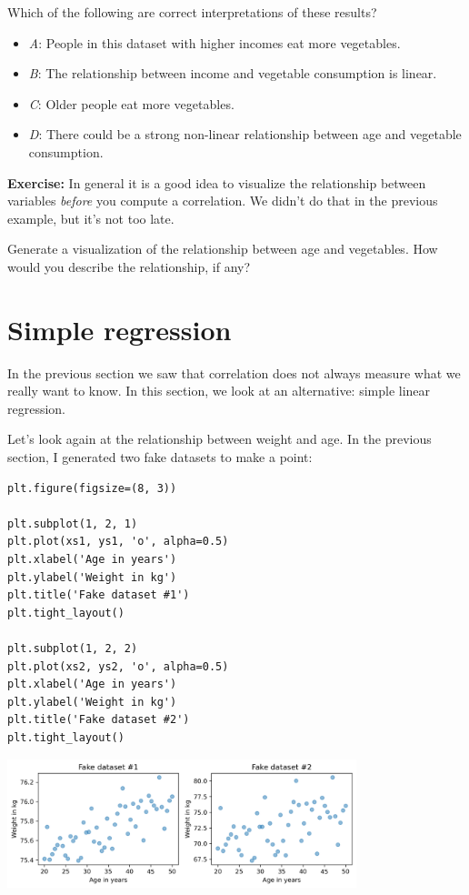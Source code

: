 Which of the following are correct interpretations of these results?

\begin{itemize}

\item
  \emph{A}: People in this dataset with higher incomes eat more
  vegetables.
\item
  \emph{B}: The relationship between income and vegetable consumption is
  linear.
\item
  \emph{C}: Older people eat more vegetables.
\item
  \emph{D}: There could be a strong non-linear relationship between age
  and vegetable consumption.
\end{itemize}

\textbf{Exercise:} In general it is a good idea to visualize the
relationship between variables \emph{before} you compute a correlation.
We didn't do that in the previous example, but it's not too late.

Generate a visualization of the relationship between age and vegetables.
How would you describe the relationship, if any?

\hypertarget{simple-regression}{%
\section{Simple regression}\label{simple-regression}}

In the previous section we saw that correlation does not always measure
what we really want to know. In this section, we look at an alternative:
simple linear regression.

Let's look again at the relationship between weight and age. In the
previous section, I generated two fake datasets to make a point:

\begin{lstlisting}[]
plt.figure(figsize=(8, 3))

plt.subplot(1, 2, 1)
plt.plot(xs1, ys1, 'o', alpha=0.5)
plt.xlabel('Age in years')
plt.ylabel('Weight in kg')
plt.title('Fake dataset #1')
plt.tight_layout()

plt.subplot(1, 2, 2)
plt.plot(xs2, ys2, 'o', alpha=0.5)
plt.xlabel('Age in years')
plt.ylabel('Weight in kg')
plt.title('Fake dataset #2')
plt.tight_layout()
\end{lstlisting}

\begin{center}
\includegraphics[width=4in]{09_relationships_files/09_relationships_78_0.png}
\end{center}

